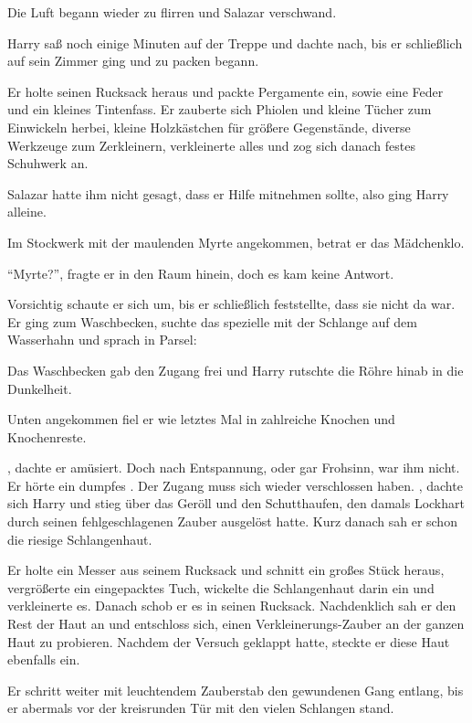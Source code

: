 Die Luft begann wieder zu flirren und Salazar verschwand.

Harry saß noch einige Minuten auf der Treppe und dachte nach, bis er schließlich auf sein Zimmer ging und zu packen begann.

Er holte seinen Rucksack heraus und packte Pergamente ein, sowie eine Feder und ein kleines Tintenfass. Er zauberte sich Phiolen und kleine Tücher zum Einwickeln herbei, kleine Holzkästchen für größere Gegenstände, diverse Werkzeuge zum Zerkleinern, verkleinerte alles und zog sich danach festes Schuhwerk an.

Salazar hatte ihm nicht gesagt, dass er Hilfe mitnehmen sollte, also ging Harry alleine.

Im Stockwerk mit der maulenden Myrte angekommen, betrat er das Mädchenklo.

\enquote{Myrte?}, fragte er in den Raum hinein, doch es kam keine Antwort.

Vorsichtig schaute er sich um, bis er schließlich feststellte, dass sie nicht da war. Er ging zum Waschbecken, suchte das spezielle mit der Schlange auf dem Wasserhahn und sprach in Parsel: 

Das Waschbecken gab den Zugang frei und Harry rutschte die Röhre hinab in die Dunkelheit.

Unten angekommen fiel er wie letztes Mal in zahlreiche Knochen und Knochenreste.

, dachte er amüsiert. Doch nach Entspannung, oder gar Frohsinn, war ihm nicht. Er hörte ein dumpfes . Der Zugang muss sich wieder verschlossen haben. , dachte sich Harry und stieg über das Geröll und den Schutthaufen, den damals Lockhart durch seinen fehlgeschlagenen Zauber ausgelöst hatte. Kurz danach sah er schon die riesige Schlangenhaut.

Er holte ein Messer aus seinem Rucksack und schnitt ein großes Stück heraus, vergrößerte ein eingepacktes Tuch, wickelte die Schlangenhaut darin ein und verkleinerte es. Danach schob er es in seinen Rucksack. Nachdenklich sah er den Rest der Haut an und entschloss sich, einen Verkleinerungs-Zauber an der ganzen Haut zu probieren. Nachdem der Versuch geklappt hatte, steckte er diese Haut ebenfalls ein.


Er schritt weiter mit leuchtendem Zauberstab den gewundenen Gang entlang, bis er abermals vor der kreisrunden Tür mit den vielen Schlangen stand.

